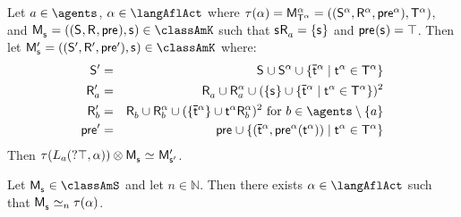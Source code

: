 \begin{lemma}\label{afl-s-construction-learning}
    Let $\agentA \in \agents$, $\alpha \in \langAflAct$ where $\tau(\alpha) = \aPModel[\alpha]{\aStatesT[\alpha]} = \aPModelTuple[\alpha]{\aStatesT[\alpha]}$, and $\aPModel{\aStateS} = \aPModelTuple{\aStateS} \in \classAmK$ such that $\aStateS \aAccessibility{\agentA} = \{\aStateS\}$ and $\aPrecondition(\aStateS) = \top$.
    Then let $\aPModel[\prime]{\aStateS} = \aPModelTuple[\prime]{\aStateS} \in \classAmK$ where:
    \begin{eqnarray*}
        \aStates[\prime] &=& \aStates \cup \aStates[\alpha] \cup \{\aPStateT[\alpha] \mid \aStateT[\alpha] \in \aStatesT[\alpha]\}\\
        \aAccessibility[\prime]{\agentA} &=& \aAccessibility{\agentA} \cup \aAccessibility[\alpha]{\agentA} \cup (\{\aStateS\} \cup \{\aPStateT[\alpha] \mid \aStateT[\alpha] \in \aStatesT[\alpha]\})^2\\
        \aAccessibility[\prime]{\agentB} &=& \aAccessibility{\agentB} \cup \aAccessibility[\alpha]{\agentB} \cup (\{\aPStateT[\alpha]\} \cup \aStateT[\alpha] \aAccessibility[\alpha]{\agentB})^2 \text{ for } \agentB \in \agents \setminus \{\agentA\}\\
        \aPrecondition[\prime] &=& \aPrecondition \cup \{(\aPStateT[\alpha], \aPrecondition[\alpha](\aStateT[\alpha])) \mid \aStateT[\alpha] \in \aStatesT[\alpha]\}
    \end{eqnarray*}
    Then $\tau(\learns_\agentA (\test{\top}, \alpha)) \exec \aPModel{\aStateS} \bisimilar \aPModel[\prime]{\aStateS[\prime]}$.
\end{lemma}

\begin{proposition}\label{afl-s-correspondence}
    Let $\aPModel{\aStateS} \in \classAmS$ and let $n \in \mathbb{N}$. 
    Then there exists $\alpha \in \langAflAct$ such that $\aPModel{\aStateS} \bisimilar[n] \tau(\alpha)$.
\end{proposition}

